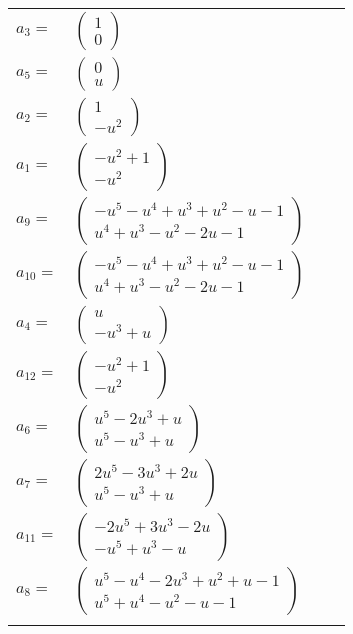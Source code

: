 \documentclass[1p]{elsarticle_modified}
\theoremstyle{definition}
\begin{document}
\begin{tabular}{m{7pt} m{180pt} m{7pt} m{180pt} }
\flushright $a_{3}=$&$\begin{pmatrix}1\\0\end{pmatrix}$ \\
\flushright $a_{5}=$&$\begin{pmatrix}0\\u\end{pmatrix}$ \\
\flushright $a_{2}=$&$\begin{pmatrix}1\\- u^2\end{pmatrix}$ \\
\flushright $a_{1}=$&$\begin{pmatrix}- u^2+1\\- u^2\end{pmatrix}$ \\
\flushright $a_{9}=$&$\begin{pmatrix}- u^5- u^4+u^3+u^2- u-1\\u^4+u^3- u^2-2 u-1\end{pmatrix}$ \\
\flushright $a_{10}=$&$\begin{pmatrix}- u^5- u^4+u^3+u^2- u-1\\u^4+u^3- u^2-2 u-1\end{pmatrix}$ \\
\flushright $a_{4}=$&$\begin{pmatrix}u\\- u^3+u\end{pmatrix}$ \\
\flushright $a_{12}=$&$\begin{pmatrix}- u^2+1\\- u^2\end{pmatrix}$ \\
\flushright $a_{6}=$&$\begin{pmatrix}u^5-2 u^3+u\\u^5- u^3+u\end{pmatrix}$ \\
\flushright $a_{7}=$&$\begin{pmatrix}2 u^5-3 u^3+2 u\\u^5- u^3+u\end{pmatrix}$ \\
\flushright $a_{11}=$&$\begin{pmatrix}-2 u^5+3 u^3-2 u\\- u^5+u^3- u\end{pmatrix}$ \\
\flushright $a_{8}=$&$\begin{pmatrix}u^5- u^4-2 u^3+u^2+u-1\\u^5+u^4- u^2- u-1\end{pmatrix}$\\&\end{tabular}
\end{document}
